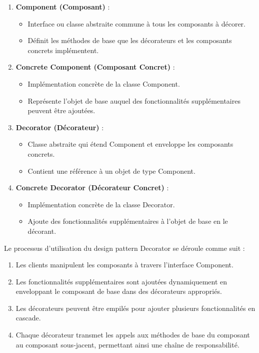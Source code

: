 \documentclass[french]{article}
\begin{document}
\begin{enumerate}
    \item \textbf{Component (Composant)} :
    \begin{itemize}
        \item Interface ou classe abstraite commune à tous les composants à décorer.
        \item Définit les méthodes de base que les décorateurs et les composants concrets implémentent.
    \end{itemize}
    
    \item \textbf{Concrete Component (Composant Concret)} :
    \begin{itemize}
        \item Implémentation concrète de la classe Component.
        \item Représente l'objet de base auquel des fonctionnalités supplémentaires peuvent être ajoutées.
    \end{itemize}
    
    \item \textbf{Decorator (Décorateur)} :
    \begin{itemize}
        \item Classe abstraite qui étend Component et enveloppe les composants concrets.
        \item Contient une référence à un objet de type Component.
    \end{itemize}
    
    \item \textbf{Concrete Decorator (Décorateur Concret)} :
    \begin{itemize}
        \item Implémentation concrète de la classe Decorator.
        \item Ajoute des fonctionnalités supplémentaires à l'objet de base en le décorant.
    \end{itemize}
\end{enumerate}

Le processus d'utilisation du design pattern Decorator se déroule comme suit :

\begin{enumerate}
    \item Les clients manipulent les composants à travers l'interface Component.
    \item Les fonctionnalités supplémentaires sont ajoutées dynamiquement en enveloppant le composant de base dans des décorateurs appropriés.
    \item Les décorateurs peuvent être empilés pour ajouter plusieurs fonctionnalités en cascade.
    \item Chaque décorateur transmet les appels aux méthodes de base du composant au composant sous-jacent, permettant ainsi une chaîne de responsabilité.
\end{enumerate}
\end{document}
